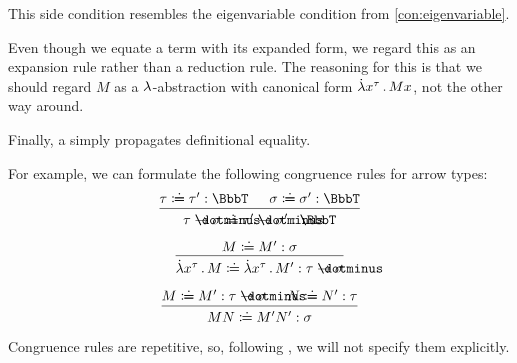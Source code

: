 \begin{remark}
\begin{thmenum}
\begin{thmenum}
      This side condition resembles the eigenvariable condition from \cref{con:eigenvariable}.

      Even though we equate a term with its expanded form, we regard this as an expansion rule rather than a reduction rule. The reasoning for this is that we should regard \( M \) as a \( {\mathrm \lambda} \)-abstraction with canonical form \( \qabs {x^\tau} M x \), not the other way around.

       Finally, a  simply propagates definitional equality.

      For example, we can formulate the following congruence rules for arrow types:
      \begin{equation*}
        \begin{prooftree}
          \hypo{ \tau \syndefeq \tau': \BbbT }
          \hypo{ \sigma \syndefeq \sigma': \BbbT }
          \infer2{ \tau \synimplies \sigma \syndefeq \tau' \synimplies \sigma': \BbbT }
        \end{prooftree}
      \end{equation*}

      \begin{paracol}{2}
        \begin{leftcolumn}
          \ParacolAlignmentHack
          \begin{equation*}
            \begin{prooftree}
              \hypo{ M \syndefeq M': \sigma }
              \infer1{ \qabs {x^{\tau}} M \syndefeq \qabs {x^{\tau}} M': \tau \synimplies \sigma }
            \end{prooftree}
          \end{equation*}
        \end{leftcolumn}

        \begin{rightcolumn}
          \ParacolAlignmentHack
          \begin{equation*}
            \begin{prooftree}
              \hypo{ M \syndefeq M': \tau \synimplies \sigma }
              \hypo{ N \syndefeq N': \tau }
              \infer2{ M N \syndefeq M' N': \sigma }
            \end{prooftree}
          \end{equation*}
        \end{rightcolumn}
      \end{paracol}
      \columnratio{}

      Congruence rules are repetitive, so, following \cite[\S A.2]{UnivalentFoundationsProgram2013HoTT}, we will not specify them explicitly.
    \end{thmenum}
  \end{thmenum}
\end{remark}
